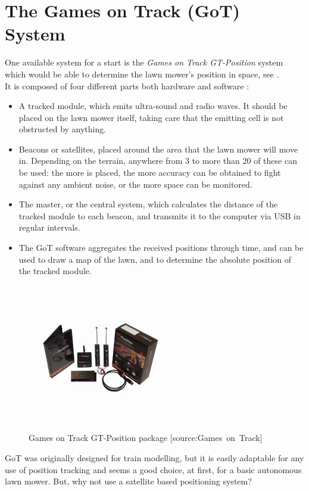 \section{The Games on Track (GoT) System}
One available system for a start is the \emph{Games on Track GT-Position} system which would be able to determine the lawn mower's position in space, see .\\
%
It is composed of four different parts both hardware and software \cite{GoTWebsitePos} :
\begin{itemize}
	\item A tracked module, which emits ultra-sound and radio waves. It should be placed on the lawn mower itself, taking care that the emitting cell is not obstructed by anything.
	\item Beacons or satellites, placed around the area that the lawn mower will move in. Depending on the terrain, anywhere from 3 to more than 20 of these can be used: the more is placed, the more accuracy can be obtained to fight against any ambient noise, or the more space can be monitored.
	\item The master, or the central system, which calculates the distance of the tracked module to each beacon, and transmits it to the computer via USB in regular intervals.
	\item The GoT software aggregates the received positions through time, and can be used to draw a map of the lawn, and to determine the absolute position of the tracked module.
\end{itemize}

\begin{figure}[H]
\centering
\includegraphics[scale=1.1]{figures/gotSystem.jpg} 
\caption{Games on Track GT-Position package [source:Games\ on\ Track]} 
\label{fig:GoTsystem}
\end{figure}
\noindent
%
GoT was originally designed for train modelling, but it is easily adaptable for any use of position tracking and seems a good choice, at first, for a basic autonomous lawn mower.
But, why not use a satellite based positioning system?
